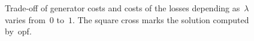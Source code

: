 \begin{figure}[t!]
\begin{subfigure}[b]{.45\textwidth}
    \label{ch:appendix:sec:facts:fig:plot-costs-losses-case118}
\end{subfigure}
\vspace{0cm}
\caption{Trade-off of generator costs and costs of the losses
          depending as~$\lambda$ varies from~$0$ to~$1$. The square cross marks
          the solution computed by~\gls{opf}.}
\label{ch:appendix:sec:facts:fig:plot-cost-losses}
\end{figure}
%
\label{ch:facts:app:grid-control-when-approaching-capacity-limits}
%
\newpage

